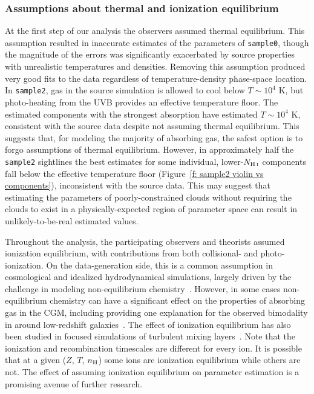 \documentclass[fleqn,usenatbib]{mnras}
\begin{document}
\subsubsection{Assumptions about thermal and ionization equilibrium}

At the first step of our analysis the observers assumed thermal equilibrium.
This assumption resulted in inaccurate estimates of the parameters of \texttt{sample0}, though the magnitude of the errors was significantly exacerbated by source properties with unrealistic temperatures and densities.
Removing this assumption produced very good fits to the data regardless of temperature-density phase-space location.
In \texttt{sample2}, gas in the source simulation is allowed to cool below $T \sim 10^4$ K,
but photo-heating from the UVB provides an effective temperature floor.
The estimated components with the strongest absorption have estimated $T \sim 10^4$ K,
consistent with the source data despite not assuming thermal equilibrium.
This suggests that, for modeling the majority of absorbing gas, the safest option is to forgo assumptions of thermal equilibrium.
However, in approximately half the \texttt{sample2} sightlines the best estimates for some individual, lower-$N_{\ion{H}{I}}$ components fall below the effective temperature floor (Figure~\ref{f: sample2 violin vs components}),
inconsistent with the source data.
This may suggest that estimating the parameters of poorly-constrained clouds without requiring the clouds to exist in a physically-expected region of parameter space can result in unlikely-to-be-real estimated values.

Throughout the analysis, the participating observers and theorists assumed ionization equilibrium, with contributions from both collisional- and photo-ionization.
On the data-generation side, this is a common assumption in cosmological and idealized hydrodynamical simulations, largely driven by the challenge in modeling non-equilibrium chemistry~\citep[e.g.][]{richings2014Nonequilibrium}.
However, in some cases non-equilibrium chemistry can have a significant effect on the properties of absorbing gas in the CGM, including providing one explanation for the observed bimodality in  around low-redshift galaxies~\citep{oppenheimer2016Bimodality}.
The effect of ionization equilibrium has also been studied in focused simulations of turbulent mixing layers~\citep[e.g.][]{ji2019Simulations}.
Note that the ionization and recombination timescales are different for every ion.
It is possible that at a given ($Z$, $T$, $n_{\rm H}$) some ions are ionization equilibrium while others are not.
The effect of assuming ionization equilibrium on parameter estimation is a promising avenue of further research.
\end{document}
